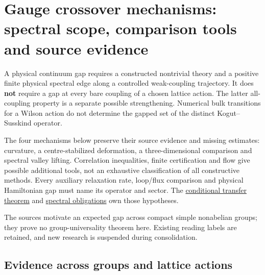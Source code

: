\documentclass[11pt,a4paper]{article}
\begin{document}
\hypertarget{gauge-crossover-mechanisms-spectral-scope-comparison-tools-and-source-evidence}{%
\section{Gauge crossover mechanisms: spectral scope, comparison tools
and source
evidence}\label{gauge-crossover-mechanisms-spectral-scope-comparison-tools-and-source-evidence}}

A physical continuum gap requires a constructed nontrivial theory and a
positive finite physical spectral edge along a controlled weak-coupling
trajectory. It does \textbf{not} require a gap at every bare coupling of
a chosen lattice action. The latter all-coupling property is a separate
possible strengthening. Numerical bulk transitions for a Wilson action
do not determine the gapped set of the distinct Kogut--Susskind
operator.

The four mechanisms below preserve their source evidence and missing
estimates: curvature, a centre-stabilized deformation, a
three-dimensional comparison and spectral valley lifting. Correlation
inequalities, finite certification and flow give possible additional
tools, not an exhaustive classification of all constructive methods.
Every auxiliary relaxation rate, loop/flux comparison and physical
Hamiltonian gap must name its operator and sector. The
\href{mass-gap-conditional-theorem.md}{conditional transfer theorem} and
\href{mass-gap-obligations-lattice.md}{spectral obligations} own those
hypotheses.

The sources motivate an expected gap across compact simple nonabelian
groups; they prove no group-universality theorem here. Existing reading
labels are retained, and new research is suspended during consolidation.

\hypertarget{evidence-across-groups-and-lattice-actions}{%
\subsection{Evidence across groups and lattice
actions}\label{evidence-across-groups-and-lattice-actions}}
\end{document}
